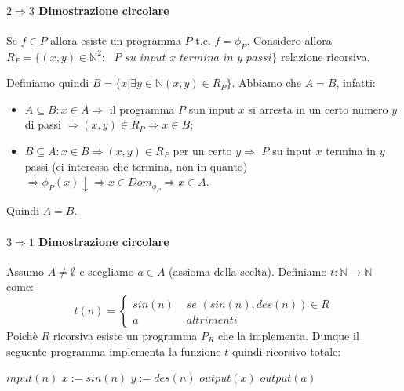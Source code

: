 \documentclass{article}
\begin{document}
\paragraph{$2 \Rightarrow 3$ Dimostrazione circolare} 
Se $f \in P$ allora esiste un programma $P$ t.c. $f=\phi_P$. Considero allora $R_P=\{ (x,y) \in \mathbb{N}^2:\textit{ $P$ su input $x$ termina in $y$ passi} \}$ relazione ricorsiva.





Definiamo quindi $B= \{ x | \exists y \in \mathbb{N} (x,y) \in R_P \}$. Abbiamo che $A=B$, infatti:
\begin{itemize}
	\item $A \subseteq B: x \in A \Rightarrow$ il programma $P$ sun input $x$ si arresta in un certo numero $y$ di passi $\Rightarrow (x,y) \in R_P \Rightarrow x \in B$;
	\item $B \subseteq A: x \in B \Rightarrow (x,y) \in R_P$ per un certo $y \Rightarrow$ $P$ su input $x$ termina in $y$ passi (ci interessa che termina, non in quanto) $\Rightarrow \phi_P(x)\downarrow \Rightarrow x \in Dom_{\phi_P} \Rightarrow x \in A$.
\end{itemize} 

Quindi $A=B$.

\paragraph{$3 \Rightarrow 1$ Dimostrazione circolare} 
Assumo $A \neq \emptyset$ e scegliamo $a \in A$ (assioma della scelta). Definiamo $t:\mathbb{N} \rightarrow \mathbb{N}$ come:
\begin{displaymath}
	t(n)=\begin{cases}
		sin(n) & \textit{ se } (sin(n),des(n)) \in R \\
		a & \textit{ altrimenti }
	\end{cases}
\end{displaymath}
Poichè $R$ ricorsiva esiste un programma $P_R$ che la implementa. Dunque il seguente programma implementa la funzione $t$ quindi ricorsivo totale:

\begin{algorithm}[h]
        \begin{algorithmic}[1]
        		 \State $input(n)$
        		 \State $x:=sin(n)$
        		 \State $y:=des(n)$
        		 	\State $output(x)$
        		 \Else
        		 	\State $output(a)$
        		 \EndIf
        		  
        \end{algorithmic}
    \end{algorithm}
\end{document}
